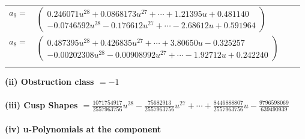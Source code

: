 \documentclass[1p]{elsarticle_modified}
\theoremstyle{definition}
\begin{document}
\begin{tabular}{m{7pt} m{180pt} m{7pt} m{180pt} }
\flushright $a_{9}=$&$\begin{pmatrix}0.246071 u^{28}+0.0868173 u^{27}+\cdots+1.21395 u+0.481140\\-0.0746592 u^{28}-0.176612 u^{27}+\cdots-2.68612 u+0.591964\end{pmatrix}$ \\
\flushright $a_{8}=$&$\begin{pmatrix}0.487395 u^{28}+0.426835 u^{27}+\cdots+3.80650 u-0.325257\\-0.00202308 u^{28}-0.00908992 u^{27}+\cdots-1.92712 u+0.242240\end{pmatrix}$\\&\end{tabular}
\flushleft \textbf{(ii) Obstruction class $= -1$}\\~\\
\flushleft \textbf{(iii) Cusp Shapes $= \frac{1071754917}{2557963756} u^{28}-\frac{75682913}{2557963756} u^{27}+\cdots+\frac{8446888807}{2557963756} u-\frac{9796598069}{639490939}$}\\~\\
\newpage\renewcommand{\arraystretch}{1}
\flushleft \textbf{(iv) u-Polynomials at the component}\newline \\
\end{document}
